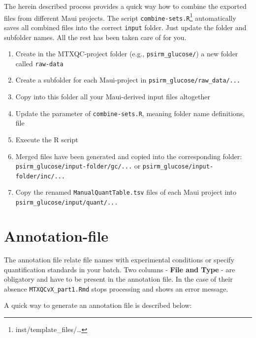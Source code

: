 \documentclass[]{book}
\providecommand{\tightlist}{%
  \setlength{\itemsep}{0pt}\setlength{\parskip}{0pt}}
\let\rmarkdownfootnote\footnote%
\def\footnote{\protect\rmarkdownfootnote}
\begin{document}
The herein described process provides a quick way how to combine the
exported files from different Maui projects. The script
\texttt{combine-sets.R}\footnote{inst/template\_files/\ldots{}}
automatically saves all combined files into the correct \texttt{input}
folder. Just update the folder and subfolder names. All the rest has
been taken care of for you.

\begin{enumerate}
\def\labelenumi{\arabic{enumi}.}
\tightlist
\item
  Create in the MTXQC-project folder (e.g., \texttt{psirm\_glucose/}) a
  new folder called \texttt{raw-data}
\item
  Create a subfolder for each Maui-project in
  \texttt{psirm\_glucose/raw\_data/...}
\item
  Copy into this folder all your Maui-derived input files altogether
\item
  Update the parameter of \texttt{combine-sets.R}, meaning folder name
  definitions, file
\item
  Execute the R script
\item
  Merged files have been generated and copied into the corresponding
  folder: \texttt{psirm\_glucose/input-folder/gc/...} or
  \texttt{psirm\_glucose/input-folder/inc/...}
\item
  Copy the renamed \texttt{ManualQuantTable.tsv} files of each Maui
  project into \texttt{psirm\_glucose/input/quant/...}
\end{enumerate}

\section{Annotation-file}\label{annotation-file}

The annotation file relate file names with experimental conditions or
specify quantification standards in your batch. Two columns -
\textbf{File and Type} - are obligatory and have to be present in the
annotation file. In the case of their absence
\texttt{MTXQCvX\_part1.Rmd} stops processing and shows an error message.

A quick way to generate an annotation file is described below:
\end{document}
